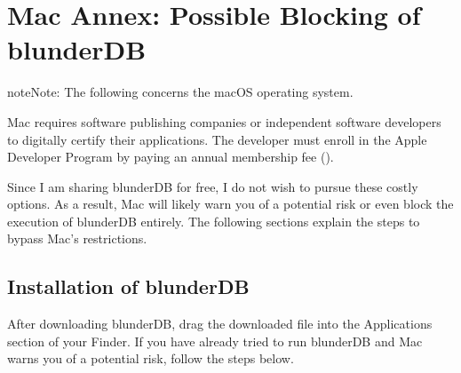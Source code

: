 \documentclass[letterpaper,10pt,english]{sphinxmanual}
\begin{document}
\begin{figure}[htbp]
\centering

\noindent{}
\end{figure}

\begin{figure}[htbp]
\centering

\noindent{}
\end{figure}

\begin{figure}[htbp]
\centering

\noindent{}
\end{figure}

\sphinxstepscope


\section{Mac Annex: Possible Blocking of blunderDB}
\label{\detokenize{annexe_mac_securite:annexe-mac-blocage-eventuel-de-blunderdb}}\label{\detokenize{annexe_mac_securite:annexe-mac-malware}}\label{\detokenize{annexe_mac_securite::doc}}
\begin{sphinxadmonition}{note}{Note:}
\sphinxAtStartPar
The following concerns the macOS operating system.
\end{sphinxadmonition}

\sphinxAtStartPar
Mac requires software publishing companies or independent software developers to digitally certify their applications. The developer must enroll in the Apple Developer Program by paying an annual membership fee ().

\sphinxAtStartPar
Since I am sharing blunderDB for free, I do not wish to pursue these costly options. As a result, Mac will likely warn you of a potential risk or even block the execution of blunderDB entirely. The following sections explain the steps to bypass Mac’s restrictions.


\subsection{Installation of blunderDB}
\label{\detokenize{annexe_mac_securite:installation-de-blunderdb}}
\sphinxAtStartPar
After downloading blunderDB, drag the downloaded file into the Applications section of your Finder. If you have already tried to run blunderDB and Mac warns you of a potential risk, follow the steps below.
\end{document}
